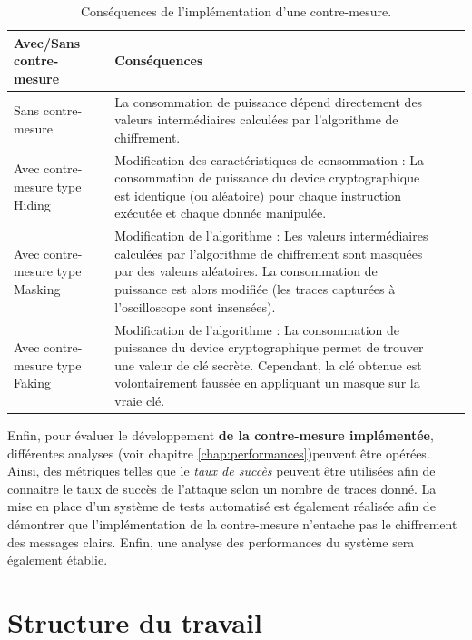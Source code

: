 \documentclass[oneside]{book}
\begin{document}
\begin{table}
	\centering
	\begin{tabular}{|l|m{9cm}|l|m{3cm}|}
    		\hline
   		 Avec/Sans contre-mesure & Conséquences \\ \hline
    		Sans contre-mesure & La consommation de puissance dépend directement des valeurs intermédiaires calculées par l’algorithme de chiffrement. \\ \hline
		Avec contre-mesure type Hiding & Modification des caractéristiques de consommation : La consommation de puissance du device cryptographique est identique (ou aléatoire) pour chaque instruction exécutée et chaque donnée manipulée. \\ \hline
    		Avec contre-mesure type Masking & Modification de l’algorithme : Les valeurs intermédiaires calculées par l’algorithme de chiffrement sont masquées par des valeurs aléatoires. La consommation de puissance est alors modifiée (les traces capturées à l’oscilloscope sont insensées). \\ \hline
		Avec contre-mesure type Faking & Modification de l’algorithme : La consommation de puissance du device cryptographique permet de trouver une valeur de clé secrète. Cependant, la clé obtenue est volontairement faussée en appliquant un masque sur la vraie clé. \\ \hline
 	\end{tabular}
 	\caption{Conséquences de l'implémentation d'une contre-mesure.}
 	\label{fig:intro2}
\end{table}

\newpage

Enfin, pour évaluer le développement \textbf{de la contre-mesure implémentée}, différentes analyses (voir chapitre \ref{chap:performances})peuvent être opérées. Ainsi, des métriques telles que le \textit{taux de succès} peuvent être utilisées afin de connaitre le taux de succès de l'attaque selon un nombre de traces donné. La mise en place d'un système de tests automatisé est également réalisée afin de démontrer que l'implémentation de la contre-mesure n'entache pas le chiffrement des messages clairs. Enfin, une analyse des performances du système sera également établie.

\section{Structure du travail}
\end{document}
